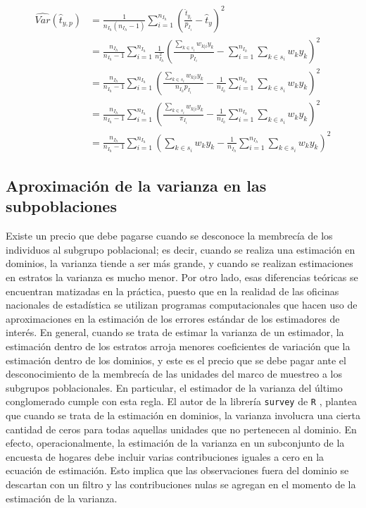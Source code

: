 \documentclass[12pt,spanish,]{book}
\begin{document}
\begin{align*}
\widehat{Var}(\hat{t}_{y,p})&=
\frac{1}{n_{I_h}(n_{I_h}-1)}\sum_{i=1}^{n_{I_h}}\left(\frac{\hat{t}_{y_i}}{p_{I_i}}-\hat{t}_{y}\right)^2\\
&=\frac{n_{I_h}}{n_{I_h}-1}\sum_{i=1}^{n_{I_h}}\frac{1}{n_{I_h}^2}\left(\frac{\sum_{k \in s_i} w_{k|i} y_k }{p_{I_i}}-\sum_{i=1}^{n_{I_h}}\sum_{k \in s_i} w_k y_k \right)^2 \\
&=\frac{n_{I_h}}{n_{I_h}-1}\sum_{i=1}^{n_{I_h}}\left(\frac{\sum_{k \in s_i} w_{k|i} y_k }{n_{I_h} p_{I_i}}-\frac{1}{n_{I_h}}\sum_{i=1}^{n_{I_h}}\sum_{k \in s_i} w_k y_k \right)^2 \\
&=\frac{n_{I_h}}{n_{I_h}-1}\sum_{i=1}^{n_{I_h}}\left(\frac{\sum_{k \in s_i} w_{k|i} y_k }{\pi_{I_i}}-\frac{1}{n_{I_h}}\sum_{i=1}^{n_{I_h}}\sum_{k \in s_i} w_k y_k \right)^2 \\
&=\frac{n_{I_h}}{n_{I_h}-1}\sum_{i=1}^{n_{I_h}}\left( \sum_{k \in s_i} w_k y_k -\frac{1}{n_{I_h}}\sum_{i=1}^{n_{I_h}}\sum_{k \in s_i} w_k y_k \right)^2 
\end{align*}

\hypertarget{aproximacion-de-la-varianza-en-las-subpoblaciones}{%
\subsection{Aproximación de la varianza en las subpoblaciones}\label{aproximacion-de-la-varianza-en-las-subpoblaciones}}

Existe un precio que debe pagarse cuando se desconoce la membrecía de los individuos al subgrupo poblacional; es decir, cuando se realiza una estimación en dominios, la varianza tiende a ser más grande, y cuando se realizan estimaciones en estratos la varianza es mucho menor. Por otro lado, esas diferencias teóricas se encuentran matizadas en la práctica, puesto que en la realidad de las oficinas nacionales de estadística se utilizan programas computacionales que hacen uso de aproximaciones en la estimación de los errores estándar de los estimadores de interés. En general, cuando se trata de estimar la varianza de un estimador, la estimación dentro de los estratos arroja menores coeficientes de variación que la estimación dentro de los dominios, y este es el precio que se debe pagar ante el desconocimiento de la membrecía de las unidades del marco de muestreo a los subgrupos poblacionales. En particular, el estimador de la varianza del último conglomerado cumple con esta regla. El autor de la librería \texttt{survey} de \texttt{R} \autocite{Lumley_2010}, plantea que cuando se trata de la estimación en dominios, la varianza involucra una cierta cantidad de ceros para todas aquellas unidades que no pertenecen al dominio. En efecto, operacionalmente, la estimación de la varianza en un subconjunto de la encuesta de hogares debe incluir varias contribuciones iguales a cero en la ecuación de estimación. Esto implica que las observaciones fuera del dominio se descartan con un filtro y las contribuciones nulas se agregan en el momento de la estimación de la varianza.
\end{document}
